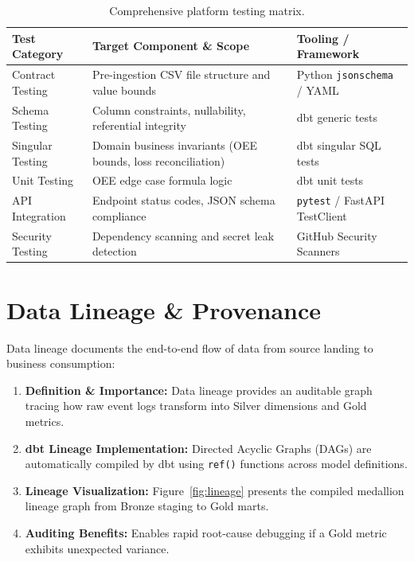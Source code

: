 \documentclass[12pt, a4paper]{report}
\begin{document}
\begin{table}[h]
\centering
\begin{tabularx}{\textwidth}{l X l}
\toprule
\textbf{\color{primary}Test Category} & \textbf{\color{primary}Target Component \& Scope} & \textbf{\color{primary}Tooling / Framework} \\
\midrule
Contract Testing & Pre-ingestion CSV file structure and value bounds & Python \texttt{jsonschema} / YAML \\
Schema Testing & Column constraints, nullability, referential integrity & dbt generic tests \\
Singular Testing & Domain business invariants (OEE bounds, loss reconciliation) & dbt singular SQL tests \\
Unit Testing & OEE edge case formula logic & dbt unit tests \\
API Integration & Endpoint status codes, JSON schema compliance & \texttt{pytest} / FastAPI TestClient \\
Security Testing & Dependency scanning and secret leak detection & GitHub Security Scanners \\
\bottomrule
\end{tabularx}
\caption{Comprehensive platform testing matrix.}
\label{tab:testing-matrix}
\end{table}

\section{Data Lineage \& Provenance}
Data lineage documents the end-to-end flow of data from source landing to business consumption:
\begin{enumerate}
    \item \textbf{Definition \& Importance:} Data lineage provides an auditable graph tracing how raw event logs transform into Silver dimensions and Gold metrics.
    \item \textbf{dbt Lineage Implementation:} Directed Acyclic Graphs (DAGs) are automatically compiled by dbt using \texttt{ref()} functions across model definitions.
    \item \textbf{Lineage Visualization:} Figure~\ref{fig:lineage} presents the compiled medallion lineage graph from Bronze staging to Gold marts.
    \item \textbf{Auditing Benefits:} Enables rapid root-cause debugging if a Gold metric exhibits unexpected variance.
\end{enumerate}
\end{document}
